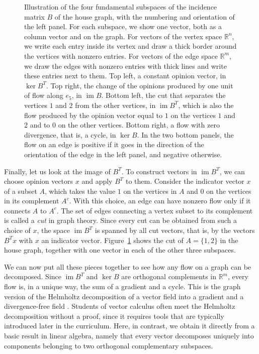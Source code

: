 \documentclass[11pt,a4paper]{article}
\theoremstyle{plain}
\theoremstyle{definition}
\newcommand{\R}{\mathbb{R}}
\newcommand{\im}{\operatorname{im}}
\begin{document}
\begin{figure}[t]
\caption{Illustration of the four fundamental subspaces of the incidence matrix $B$ of the house graph, with the numbering and orientation of the left panel. For each subspace, we show one vector, both as a column vector and on the graph. For vectors of the vertex space $\R^n$, we write each entry inside its vertex and draw a thick border around the vertices with nonzero entries. For vectors of the edge space $\R^m$, we draw the edges with nonzero entries with thick lines and write these entries next to them. Top left, a constant opinion vector, in $\ker B^T$. Top right, the change of the opinions produced by one unit of flow along $e_5$, in $\operatorname{im}B$. Bottom left, the cut that separates the vertices $1$ and $2$ from the other vertices, in $\operatorname{im}B^T$, which is also the flow produced by the opinion vector equal to $1$ on the vertices $1$ and $2$ and to $0$ on the other vertices. Bottom right, a flow with zero divergence, that is, a cycle, in $\ker B$. In the two bottom panels, the flow on an edge is positive if it goes in the direction of the orientation of the edge in the left panel, and negative otherwise.}
\label{fig:subspaces}
\end{figure}

Finally, let us look at the image of $B^T$. To construct vectors in $\im B^T$, we can choose opinion vectors $x$ and apply $B^T$ to them. Consider the indicator vector $x$ of a subset $A$, which takes the value $1$ on the vertices in $A$ and $0$ on the vertices in its complement $A^c$.  With this choice, an edge can have nonzero flow only if it connects $A$ to $A^c$. The set of edges connecting a vertex subset to its complement is called a \emph{cut} in graph theory. Since every cut can be obtained from such a choice of $x$, the space $\im B^T$ is spanned by all cut vectors, that is, by the vectors $B^Tx$ with $x$ an indicator vector. Figure~\ref{fig:subspaces} shows the cut of $A=\{1,2\}$ in the house graph, together with one vector in each of the other three subspaces.

We can now put all these pieces together to see how any flow on a graph can be decomposed. Since $\operatorname{im}B^T$ and $\ker B$ are orthogonal complements in $\mathbb{R}^m$, every flow is, in a unique way, the sum of a gradient and a cycle. This is the graph version of the Helmholtz decomposition of a vector field into a gradient and a divergence-free field \cite{lim2020}. Students of vector calculus often meet the Helmholtz decomposition without a proof, since it requires tools that are typically introduced later in the curriculum. Here, in contrast, we obtain it directly from a basic result in linear algebra, namely that every vector decomposes uniquely into components belonging to two orthogonal complementary subspaces. 
\end{document}

